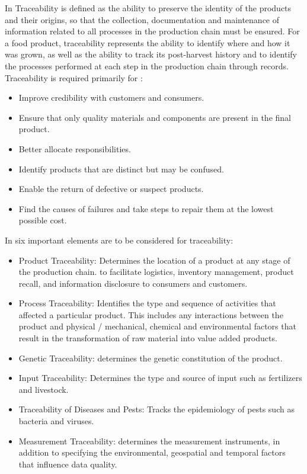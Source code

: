 In \cite{gryna1998juran, Opara2001} Traceability is defined as the ability to preserve the identity of the products and their origins, so that the collection, documentation and maintenance of information related to all processes in the production chain must be ensured. For a food product, traceability represents the ability to identify where and how it was grown, as well as the ability to track its post-harvest history and to identify the processes performed at each step in the production chain through records. Traceability is required primarily for \cite{horiuchirastreabilidade}:
\begin{itemize}
\item Improve credibility with customers and consumers.
\item Ensure that only quality materials and components are present in the final product.
\item Better allocate responsibilities.
\item Identify products that are distinct but may be confused.
\item Enable the return of defective or suspect products.
\item Find the causes of failures and take steps to repair them at the lowest possible cost.
\end{itemize}

In \cite{opara2003traceability} six important elements are to be considered for traceability:

\begin{itemize}
\item Product Traceability: Determines the location of a product at any stage of the production chain. to facilitate logistics, inventory management, product recall, and information disclosure to consumers and customers.
\item Process Traceability: Identifies the type and sequence of activities that affected a particular product. This includes any interactions between the product and physical / mechanical, chemical and environmental factors that result in the transformation of raw material into value added products.
\item Genetic Traceability: determines the genetic constitution of the product.
\item Input Traceability: Determines the type and source of input such as fertilizers and livestock.
\item Traceability of Diseases and Pests: Tracks the epidemiology of pests such as bacteria and viruses.
\item Measurement Traceability: determines the measurement instruments, in addition to specifying the environmental, geospatial and temporal factors that influence data quality.
\end{itemize}

